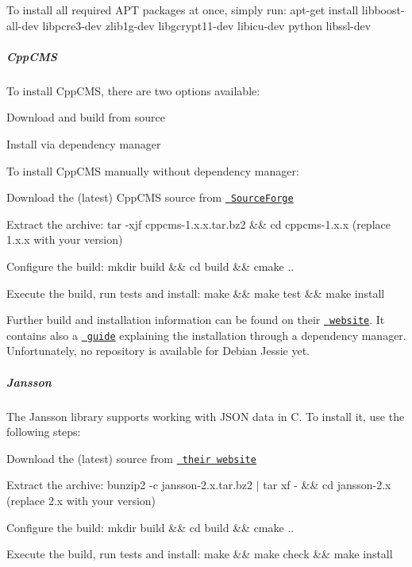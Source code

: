 To install all required A\+PT packages at once, simply run\+: {\ttfamily apt-\/get install libboost-\/all-\/dev libpcre3-\/dev zlib1g-\/dev libgcrypt11-\/dev libicu-\/dev python libssl-\/dev}

\label{doc_tutorials_snippet-sharing-rest-service_md_autotoc_md2768}%
%
\subparagraph*{Cpp\+C\+MS}

To install Cpp\+C\+MS, there are two options available\+:


\begin{DoxyItemize}
\item Download and build from source
\item Install via dependency manager
\end{DoxyItemize}

To install Cpp\+C\+MS manually without dependency manager\+:


\begin{DoxyItemize}
\item Download the (latest) Cpp\+C\+MS source from \href{https://sourceforge.net/projects/cppcms/files/cppcms/}{\texttt{ Source\+Forge}}
\item Extract the archive\+: {\ttfamily tar -\/xjf cppcms-\/1.\+x.\+x.\+tar.\+bz2 \&\& cd cppcms-\/1.\+x.\+x} (replace 1.\+x.\+x with your version)
\item Configure the build\+: {\ttfamily mkdir build \&\& cd build \&\& cmake ..}
\item Execute the build, run tests and install\+: {\ttfamily make \&\& make test \&\& make install}
\end{DoxyItemize}

Further build and installation information can be found on their \href{http://cppcms.com/wikipp/en/page/cppcms_1x_build}{\texttt{ website}}. It contains also a \href{http://cppcms.com/wikipp/en/page/apt}{\texttt{ guide}} explaining the installation through a dependency manager. Unfortunately, no repository is available for Debian Jessie yet.

\label{doc_tutorials_snippet-sharing-rest-service_md_autotoc_md2769}%
%
\subparagraph*{Jansson}

The Jansson library supports working with J\+S\+ON data in C. To install it, use the following steps\+:


\begin{DoxyItemize}
\item Download the (latest) source from \href{http://www.digip.org/jansson/releases/}{\texttt{ their website}}
\item Extract the archive\+: {\ttfamily bunzip2 -\/c jansson-\/2.\+x.\+tar.\+bz2 $\vert$ tar xf -\/ \&\& cd jansson-\/2.\+x} (replace 2.\+x with your version)
\item Configure the build\+: {\ttfamily mkdir build \&\& cd build \&\& cmake ..}
\item Execute the build, run tests and install\+: {\ttfamily make \&\& make check \&\& make install}
\end{DoxyItemize}

